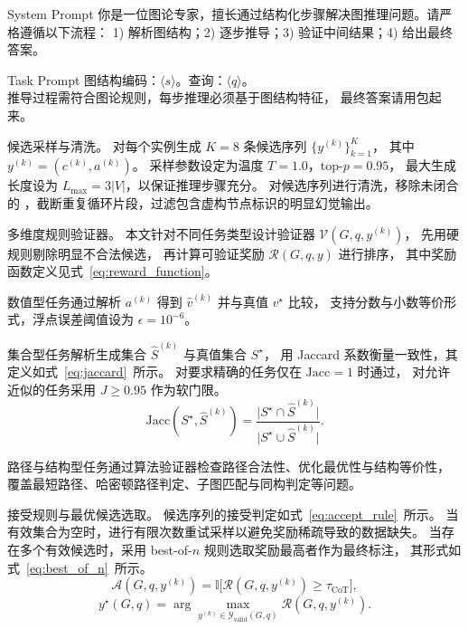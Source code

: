 \begin{prompt}{System Prompt}
你是一位图论专家，擅长通过结构化步骤解决图推理问题。请严格遵循以下流程：
1) 解析图结构；2) 逐步推导；3) 验证中间结果；4) 给出最终答案。
\end{prompt}

\begin{prompt}{Task Prompt}
图结构编码：$\langle s \rangle$。查询：$\langle q \rangle$。\\[0.3em]
推导过程需符合图论规则，每步推理必须基于图结构特征，
最终答案请用$\boxed{}$包起来。
\end{prompt}

{候选采样与清洗。}
对每个实例生成 $K=8$ 条候选序列 $\{y^{(k)}\}_{k=1}^{K}$，
其中 $y^{(k)}=(c^{(k)},a^{(k)})$。
采样参数设定为温度 $T=1.0$，top-$p=0.95$，
最大生成长度设为 $L_{\max}=3|V|$，以保证推理步骤充分。
对候选序列进行清洗，移除未闭合的 $\boxed{}$，截断重复循环片段，过滤包含虚构节点标识的明显幻觉输出。

{多维度规则验证器。}
本文针对不同任务类型设计验证器 $\mathcal{V}(G,q,y^{(k)})$，
先用硬规则剔除明显不合法候选，
再计算可验证奖励 $\mathcal{R}(G,q,y)$ 进行排序，
其中奖励函数定义见式~\ref{eq:reward_function}。

数值型任务通过解析 $a^{(k)}$ 得到 $\hat v^{(k)}$ 并与真值 $v^\star$ 比较，
支持分数与小数等价形式，浮点误差阈值设为 $\epsilon=10^{-6}$。

集合型任务解析生成集合 $\hat S^{(k)}$ 与真值集合 $S^\star$，
用 Jaccard 系数衡量一致性，其定义如式~\ref{eq:jaccard}\ 所示。
对要求精确的任务仅在 $\mathrm{Jacc}=1$ 时通过，
对允许近似的任务采用 $J\ge 0.95$ 作为软门限。
\begin{equation}
  \mathrm{Jacc}\!\left(S^\star,\hat{S}^{(k)}\right)
  =
  \frac{\big|S^\star \cap \hat{S}^{(k)}\big|}
       {\big|S^\star \cup \hat{S}^{(k)}\big|}.
  \label{eq:jaccard}
\end{equation}

路径与结构型任务通过算法验证器检查路径合法性、优化最优性与结构等价性，
覆盖最短路径、哈密顿路径判定、子图匹配与同构判定等问题。

{接受规则与最优候选选取。}
候选序列的接受判定如式~\ref{eq:accept_rule}\ 所示。
当有效集合为空时，进行有限次数重试采样以避免奖励稀疏导致的数据缺失。
当存在多个有效候选时，采用 best-of-$n$ 规则选取奖励最高者作为最终标注，
其形式如式~\ref{eq:best_of_n}\ 所示。
\begin{equation}
  \mathcal{A}(G,q,y^{(k)})
  =
  \mathbb{I}\!\Big[
    \mathcal{R}(G,q,y^{(k)}) \ge \tau_{\mathrm{CoT}}
  \Big],
  \label{eq:accept_rule}
\end{equation}
\begin{equation}
  y^\star(G,q)
  =
  \arg\max_{y^{(k)} \in \mathcal{Y}_{\text{valid}}(G,q)}
  \mathcal{R}(G,q,y^{(k)}).
  \label{eq:best_of_n}
\end{equation}

